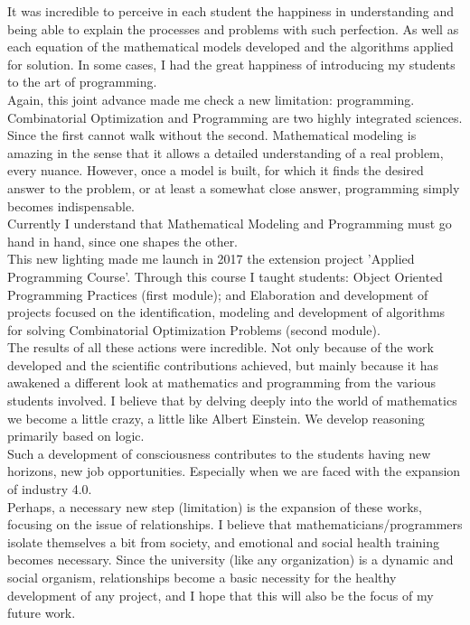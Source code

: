 \documentclass{book}
\begin{document}
It was incredible to perceive in each student the happiness in understanding and being able to explain the processes and problems with such perfection. As well as each equation of the mathematical models developed and the algorithms applied for solution. In some cases, I had the great happiness of introducing my students to the art of programming. \\

Again, this joint advance made me check a new limitation: programming. Combinatorial Optimization and Programming are two highly integrated sciences. Since the first cannot walk without the second. Mathematical modeling is amazing in the sense that it allows a detailed understanding of a real problem, every nuance. However, once a model is built, for which it finds the desired answer to the problem, or at least a somewhat close answer, programming simply becomes indispensable. \\

Currently I understand that Mathematical Modeling and Programming must go hand in hand, since one shapes the other. \\

This new lighting made me launch in 2017 the extension project 'Applied Programming Course'. Through this course I taught students: Object Oriented Programming Practices (first module); and Elaboration and development of projects focused on the identification, modeling and development of algorithms for solving Combinatorial Optimization Problems (second module). \\



The results of all these actions were incredible. Not only because of the work developed and the scientific contributions achieved, but mainly because it has awakened a different look at mathematics and programming from the various students involved. I believe that by delving deeply into the world of mathematics we become a little crazy, a little like Albert Einstein. We develop reasoning primarily based on logic. \\

Such a development of consciousness contributes to the students having new horizons, new job opportunities. Especially when we are faced with the expansion of industry 4.0. \\

Perhaps, a necessary new step (limitation) is the expansion of these works, focusing on the issue of relationships. I believe that mathematicians/programmers isolate themselves a bit from society, and emotional and social health training becomes necessary. Since the university (like any organization) is a dynamic and social organism, relationships become a basic necessity for the healthy development of any project, and I hope that this will also be the focus of my future work. \\
\end{document}
